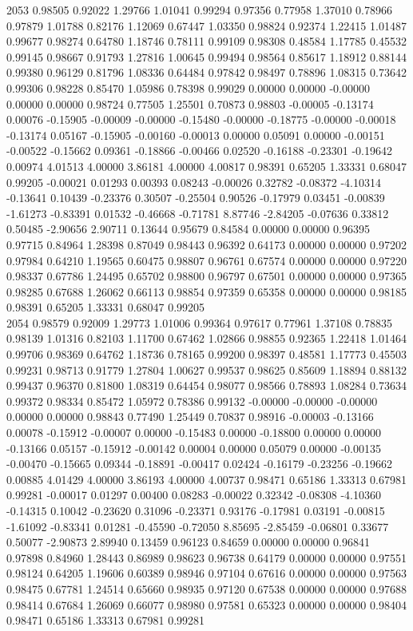 {2053 0.98505 0.92022 1.29766 1.01041 0.99294 0.97356 0.77958 1.37010 0.78966 0.97879 1.01788 0.82176 1.12069 0.67447 1.03350 0.98824 0.92374 1.22415 1.01487 0.99677 0.98274 0.64780 1.18746 0.78111 0.99109 0.98308 0.48584 1.17785 0.45532 0.99145 0.98667 0.91793 1.27816 1.00645 0.99494 0.98564 0.85617 1.18912 0.88144 0.99380 0.96129 0.81796 1.08336 0.64484 0.97842 0.98497 0.78896 1.08315 0.73642 0.99306 0.98228 0.85470 1.05986 0.78398 0.99029 0.00000 0.00000 -0.00000 0.00000 0.00000 0.98724 0.77505 1.25501 0.70873 0.98803 -0.00005 -0.13174 0.00076 -0.15905 -0.00009 -0.00000 -0.15480 -0.00000 -0.18775 -0.00000 -0.00018 -0.13174 0.05167 -0.15905 -0.00160 -0.00013 0.00000 0.05091 0.00000 -0.00151 -0.00522 -0.15662 0.09361 -0.18866 -0.00466 0.02520 -0.16188 -0.23301 -0.19642 0.00974 4.01513 4.00000 3.86181 4.00000 4.00817 0.98391 0.65205 1.33331 0.68047 0.99205 -0.00021 0.01293 0.00393 0.08243 -0.00026 0.32782 -0.08372 -4.10314 -0.13641 0.10439 -0.23376 0.30507 -0.25504 0.90526 -0.17979 0.03451 -0.00839 -1.61273 -0.83391 0.01532 -0.46668 -0.71781 8.87746 -2.84205 -0.07636 0.33812 0.50485 -2.90656 2.90711 0.13644 0.95679 0.84584 0.00000 0.00000 0.96395 0.97715 0.84964 1.28398 0.87049 0.98443 0.96392 0.64173 0.00000 0.00000 0.97202 0.97984 0.64210 1.19565 0.60475 0.98807 0.96761 0.67574 0.00000 0.00000 0.97220 0.98337 0.67786 1.24495 0.65702 0.98800 0.96797 0.67501 0.00000 0.00000 0.97365 0.98285 0.67688 1.26062 0.66113 0.98854 0.97359 0.65358 0.00000 0.00000 0.98185 0.98391 0.65205 1.33331 0.68047 0.99205 \\
2054 0.98579 0.92009 1.29773 1.01006 0.99364 0.97617 0.77961 1.37108 0.78835 0.98139 1.01316 0.82103 1.11700 0.67462 1.02866 0.98855 0.92365 1.22418 1.01464 0.99706 0.98369 0.64762 1.18736 0.78165 0.99200 0.98397 0.48581 1.17773 0.45503 0.99231 0.98713 0.91779 1.27804 1.00627 0.99537 0.98625 0.85609 1.18894 0.88132 0.99437 0.96370 0.81800 1.08319 0.64454 0.98077 0.98566 0.78893 1.08284 0.73634 0.99372 0.98334 0.85472 1.05972 0.78386 0.99132 -0.00000 -0.00000 -0.00000 0.00000 0.00000 0.98843 0.77490 1.25449 0.70837 0.98916 -0.00003 -0.13166 0.00078 -0.15912 -0.00007 0.00000 -0.15483 0.00000 -0.18800 0.00000 0.00000 -0.13166 0.05157 -0.15912 -0.00142 0.00004 0.00000 0.05079 0.00000 -0.00135 -0.00470 -0.15665 0.09344 -0.18891 -0.00417 0.02424 -0.16179 -0.23256 -0.19662 0.00885 4.01429 4.00000 3.86193 4.00000 4.00737 0.98471 0.65186 1.33313 0.67981 0.99281 -0.00017 0.01297 0.00400 0.08283 -0.00022 0.32342 -0.08308 -4.10360 -0.14315 0.10042 -0.23620 0.31096 -0.23371 0.93176 -0.17981 0.03191 -0.00815 -1.61092 -0.83341 0.01281 -0.45590 -0.72050 8.85695 -2.85459 -0.06801 0.33677 0.50077 -2.90873 2.89940 0.13459 0.96123 0.84659 0.00000 0.00000 0.96841 0.97898 0.84960 1.28443 0.86989 0.98623 0.96738 0.64179 0.00000 0.00000 0.97551 0.98124 0.64205 1.19606 0.60389 0.98946 0.97104 0.67616 0.00000 0.00000 0.97563 0.98475 0.67781 1.24514 0.65660 0.98935 0.97120 0.67538 0.00000 0.00000 0.97688 0.98414 0.67684 1.26069 0.66077 0.98980 0.97581 0.65323 0.00000 0.00000 0.98404 0.98471 0.65186 1.33313 0.67981 0.99281 \\
}

